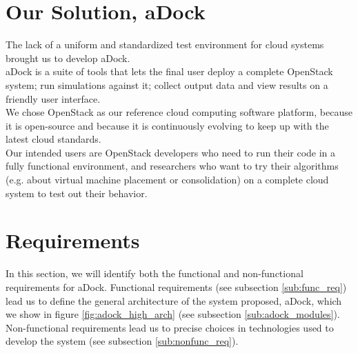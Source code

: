 
%
%




\section{Our Solution, aDock}
\label{sec:adock_intro}
The lack of a uniform and standardized test environment for cloud systems brought us to develop aDock.\\
aDock is a suite of tools that lets the final user deploy a complete OpenStack system; run simulations against it; collect output data and view results on a friendly user interface.\\
We chose OpenStack as our reference cloud computing software platform, because it is open-source and because it is continuously evolving to keep up with the latest cloud standards.\\
Our intended users are OpenStack developers who need to run their code in a fully functional environment, and researchers who want to try their algorithms (e.g. about virtual machine placement or consolidation) on a complete cloud system to test out their behavior.

\section{Requirements}
\label{sec:adock_reqs}
In this section, we will identify both the functional and non-functional requirements for aDock. Functional requirements (see subsection \ref{sub:func_req}) lead us to define the general architecture of the system proposed, aDock, which we show in figure \ref{fig:adock_high_arch} (see subsection \ref{sub:adock_modules}). Non-functional requirements lead us to precise choices in technologies used to develop the system (see subsection \ref{sub:nonfunc_req}).

